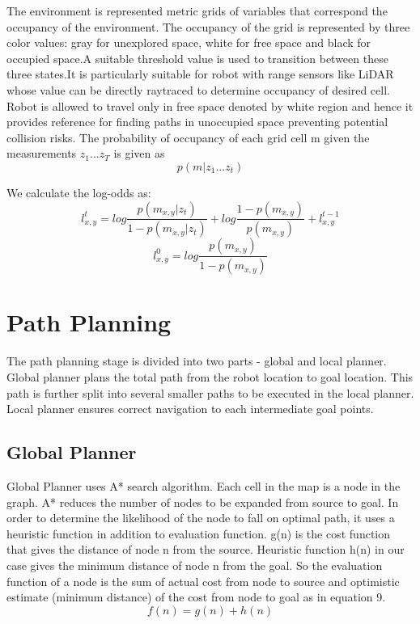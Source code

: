 \documentclass[journal,twoside]{IEEEtran}
\begin{document}
\par\noindent The environment is represented metric grids of variables that correspond the occupancy of the environment. The occupancy of the grid is represented by three color values: gray for unexplored space, white for free space and black for occupied space.A suitable threshold value is used to transition between these three states.It is particularly suitable for robot with range sensors like LiDAR whose value can be directly raytraced to determine occupancy of desired cell. Robot is allowed to travel only in free space denoted by white region and hence it provides reference for finding paths in unoccupied space preventing potential collision risks. The probability of occupancy of each grid cell m given the measurements $z_1...z_T$ is given as
$$p(m|z_1...z_t)$$
\par\noindent We calculate the log-odds as: \newline
\begin{equation}
l^t_{x,y} = log\frac{p(m_{x,y}|z_t)}{1-p(m_{x,y}|z_t)}+ log\frac{1-p(m_{x,y})}{p(m_{x,y})}+l^{t-1}_{x,y} 
\end{equation} 
\begin{equation}
l^0_{x,y} = log\frac{p(m_{x,y})}{1-p(m_{x,y})}
\end{equation} 
\section{Path Planning}
\noindent The path planning stage is divided into two parts - global and local planner. Global planner plans the total path from the robot location to goal location. This path is further split into several smaller paths to be executed in the local planner. Local planner ensures correct navigation to each intermediate goal points.

\subsection{Global Planner}
\noindent Global Planner uses A* search algorithm. Each cell in the map is a node in the graph. A* reduces the number of nodes to be expanded from source to goal. In order to determine the likelihood of the node to fall on optimal path, it uses a heuristic function in addition to evaluation function. g(n) is the cost function that gives the distance of node n from the source. Heuristic function h(n) in our case gives the minimum distance of node n from the goal. So the evaluation function of a node is the sum of actual cost from node to source and optimistic estimate (minimum distance) of the cost from node to goal as in equation 9.
\begin{equation}
f(n) = g(n) + h(n)
\end{equation}
\end{document}
